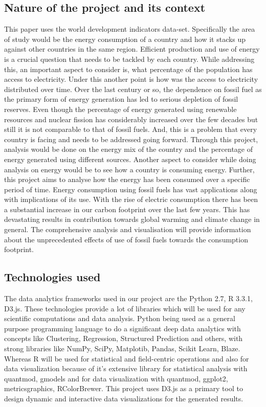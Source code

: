 \documentclass{sig-alternate-05-2015}
\begin{document}
\subsection{Nature of the project and its context}
This paper uses the world development indicators data-set. Specifically the area of study would be the energy consumption of a country and how it stacks up against other countries in the same region. Efficient production and use of energy is a crucial question that needs to be tackled by each country. While addressing this, an important aspect to consider is, what percentage of the population has access to electricity. Under this another point is how was the access to electricity distributed over time. Over the last century or so, the dependence on fossil fuel as the primary form of energy generation has led to serious depletion of fossil reserves. Even though the percentage of energy generated using renewable resources and nuclear fission has considerably increased over the few decades but still it is not comparable to that of fossil fuels. And, this is a problem that every country is facing and needs to be addressed going forward. Through this project, analysis would be done on the energy mix of the country and the percentage of energy generated using different sources. Another aspect to consider while doing analysis on energy would be to see how a country is consuming energy. Further, this project aims to analyse how the energy has been consumed over a specific period of time. Energy consumption using fossil fuels has vast applications along with implications of its use. With the rise of electric consumption there has been a substantial increase in our carbon footprint over the last few years.  
This has devastating results in contribution towards global warming and climate change in general. The comprehensive analysis and visualisation will provide information about the unprecedented effects of use of fossil fuels towards the consumption footprint. 
\\

\subsection{Technologies used}
The data analytics frameworks used in our project are the Python 2.7, R 3.3.1, D3.js. These technologies provide a lot of libraries which will be used for any scientific computations and data analysis. Python being used as a general purpose programming language to do a significant deep data analytics with concepts like Clustering, Regression, Structured Prediction and others, with strong libraries like NumPy, SciPy, Matplotib, Pandas, Scikit Learn, Blaze. \cite{www-python} Whereas R will be used for statistical and field-centric operations and also for data visualization because of it's extensive library for statistical analysis with quantmod, gmodels and for data visualization with quantmod, ggplot2, metricsgraphics, RColorBrewer. \cite{www-libs} This project uses D3.js as a primary tool to design dynamic and interactive data visualizations for the generated results.
\end{document}
